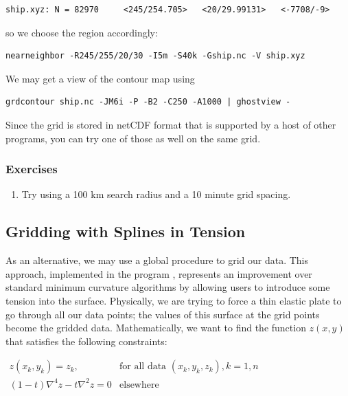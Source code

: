 \documentclass{report}
\begin{document}
{\small\begin{verbatim}
ship.xyz: N = 82970     <245/254.705>   <20/29.99131>   <-7708/-9>
\end{verbatim}
}

so we choose the region accordingly:

{\small\begin{verbatim}
nearneighbor -R245/255/20/30 -I5m -S40k -Gship.nc -V ship.xyz
\end{verbatim}
}

We may get a view of the contour map using

{\small\begin{verbatim} 
grdcontour ship.nc -JM6i -P -B2 -C250 -A1000 | ghostview -
\end{verbatim}
}

Since the grid  is stored in netCDF format that is supported by a host of other programs,
you can try one of those as well on the same grid.

\subsubsection{Exercises}

\begin{enumerate}

\item Try using a 100 km search radius and a 10 minute grid spacing.

\end{enumerate}

\subsection{Gridding with Splines in Tension}

As an alternative, we may use a global procedure to grid our data.
This approach, implemented in the program , represents
an improvement over standard minimum curvature algorithms by allowing
users to introduce some tension into the surface.
Physically, we are trying to force a thin elastic plate to go through
all our data points; the values of this surface at the grid points
become the gridded data.  Mathematically, we want to find the function
$z(x, y)$ that satisfies the following constraints: \\

\( \begin{array}{ll}
z(x_k, y_k) = z_k,      &       \mbox{for all data $(x_k, y_k, z_k), k =1,n$} \\
(1-t)\nabla^4 z -  t \nabla^2 z = 0     &       \mbox{elsewhere}
\end{array} \) \\
\end{document}
